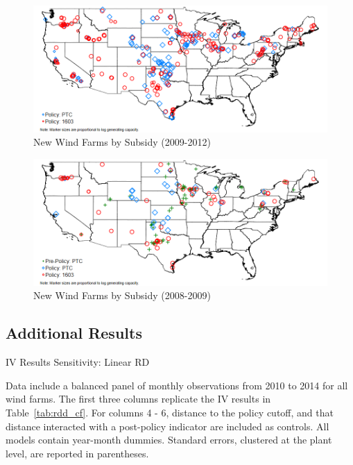 \documentclass[12pt]{article}
\begin{document}
\clearpage

\begin{figure} \centering
	\caption{New Wind Farms by Subsidy (2009-2012)\label{map:2009to2012}}
	\includegraphics[width=\textwidth]{map_2009to2012.png}
\end{figure}

\begin{figure} \centering
	\caption{New Wind Farms by Subsidy (2008-2009)\label{map:2008to2009}}
	\includegraphics[width=\textwidth]{map_2008to2009.png}
\end{figure}

\subsection{Additional Results}

\begin{table}[H]
\caption{IV Results Sensitivity: Linear RD \label{tab:rdd_cf_linear}}
\begin{center}{\footnotesize{}}\end{center}
\footnotesize
Data include a balanced panel of monthly observations from 2010 to 2014 for all wind farms. The first three columns replicate the IV results in Table~\ref{tab:rdd_cf}. For columns 4 - 6, distance to the policy cutoff, and that distance interacted with a post-policy indicator are included as controls. All models contain year-month dummies. Standard errors, clustered at the plant level, are reported in parentheses.
\end{table}
\end{document}
